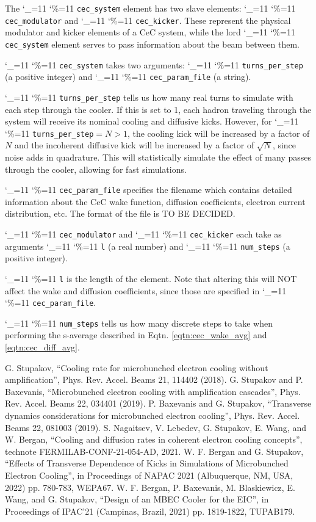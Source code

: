 \documentclass[letterpaper,11pt]{article}
\newcommand{\vn}{\begingroup\catcode`\_=11 \catcode`\%=11 \dottcmd}
\newcommand\dottcmd[1]{\texttt{#1}\endgroup}
\begin{document}
The \vn{cec_system} element has two slave elements: \vn{cec_modulator} and \vn{cec_kicker}. These represent the physical modulator and kicker elements of a CeC system, while the lord \vn{cec_system} element serves to pass information about the beam between them.

\vn{cec_system} takes two arguments: \vn{turns_per_step} (a positive integer) and \vn{cec_param_file} (a string).

\vn{turns_per_step} tells us how many real turns to simulate with each step through the cooler. If this is set to 1, each hadron traveling through the system will receive its nominal cooling and diffusive kicks. However, for \vn{turns_per_step}$ = N > 1$, the cooling kick will be increased by a factor of $N$ and the incoherent diffusive kick will be increased by a factor of $\sqrt{N}$, since noise adds in quadrature. This will statistically simulate the effect of many passes through the cooler, allowing for fast simulations.

\vn{cec_param_file} specifies the filename which contains detailed information about the CeC wake function, diffusion coefficients, electron current distribution, etc. The format of the file is TO BE DECIDED.

\vn{cec_modulator} and \vn{cec_kicker} each take as arguments \vn{l} (a real number) and \vn{num_steps} (a positive integer).

\vn{l} is the length of the element. Note that altering this will NOT affect the wake and diffusion coefficients, since those are specified in \vn{cec_param_file}.

\vn{num_steps} tells us how many discrete steps to take when performing the s-average described in Eqtn. \ref{eqtn:cec_wake_avg} and \ref{eqtn:cec_diff_avg}.

\begin{thebibliography}{9}   %
		G. Stupakov, ``Cooling rate for microbunched electron cooling without amplification'', Phys. Rev. Accel. Beams 21, 114402 (2018).
		G. Stupakov and P. Baxevanis, ``Microbunched electron cooling with amplification cascades'', Phys. Rev. Accel. Beams 22, 034401 (2019).
		P. Baxevanis and G. Stupakov, ``Transverse dynamics considerations for microbunched electron cooling'', Phys. Rev. Accel. Beams 22, 081003 (2019).
		 S. Nagaitsev, V. Lebedev, G. Stupakov, E. Wang, and W. Bergan, ``Cooling and diffusion rates in coherent electron  cooling concepts'', technote FERMILAB-CONF-21-054-AD, 2021.
                W. F. Bergan and G. Stupakov, ``Effects of Transverse Dependence of Kicks in Simulations of Microbunched Electron Cooling'', in Proceedings of NAPAC 2021 (Albuquerque, NM, USA, 2022) pp. 780-783, WEPA67.
                W. F. Bergan, P. Baxevanis, M. Blaskiewicz, E. Wang, and G. Stupakov, ``Design of an MBEC Cooler for the EIC'', in Proceedings of IPAC'21 (Campinas, Brazil, 2021) pp. 1819-1822, TUPAB179.
\end{thebibliography}
\end{document}
